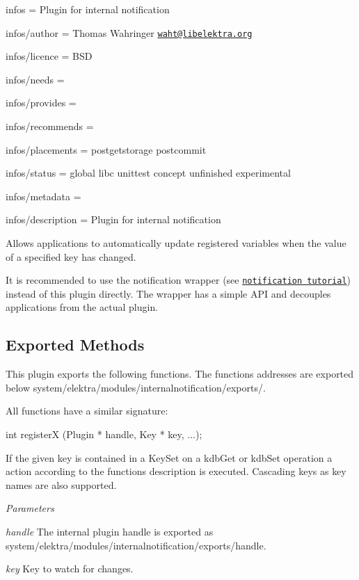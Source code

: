 
\begin{DoxyItemize}
\item infos = Plugin for internal notification
\item infos/author = Thomas Wahringer \href{mailto:waht@libelektra.org}{\tt waht@libelektra.\+org}
\item infos/licence = B\+SD
\item infos/needs =
\item infos/provides =
\item infos/recommends =
\item infos/placements = postgetstorage postcommit
\item infos/status = global libc unittest concept unfinished experimental
\item infos/metadata =
\item infos/description = Plugin for internal notification
\end{DoxyItemize}

Allows applications to automatically update registered variables when the value of a specified key has changed.

It is recommended to use the notification wrapper (see \href{https://www.libelektra.org/tutorials/notifications}{\tt notification tutorial}) instead of this plugin directly. The wrapper has a simple A\+PI and decouples applications from the actual plugin.

\subsection*{Exported Methods}

This plugin exports the following functions. The functions addresses are exported below {\ttfamily system/elektra/modules/internalnotification/exports/}.

All functions have a similar signature\+:


\begin{DoxyCode}
\textcolor{keywordtype}{int} registerX (Plugin * handle, Key * key, ...);
\end{DoxyCode}


If the given {\ttfamily key} is contained in a Key\+Set on a kdb\+Get or kdb\+Set operation a action according to the function\textquotesingle{}s description is executed. Cascading keys as {\ttfamily key} names are also supported.

{\itshape Parameters}


\begin{DoxyItemize}
\item {\itshape handle} The internal plugin {\ttfamily handle} is exported as {\ttfamily system/elektra/modules/internalnotification/exports/handle}.
\item {\itshape key} Key to watch for changes.
\end{DoxyItemize}

